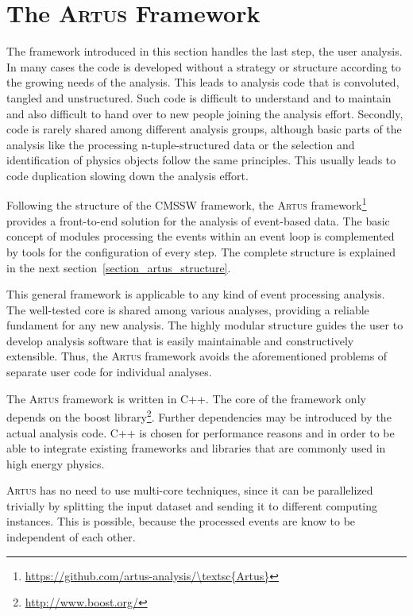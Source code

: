 \documentclass[3p]{elsarticle}
\newcommand{\software}[1]{\textsc{#1}\xspace}
\newcommand{\artus}{\software{Artus}}
\begin{document}
\section{The \artus Framework \label{section_artus_motivation}}

The framework introduced in this section handles the last step, the user analysis.
In many cases the code is developed without a strategy or structure according to the growing needs of the analysis.
This leads to analysis code that is convoluted, tangled and unstructured.
Such code is difficult to understand and to maintain and also difficult to hand over to new people joining the analysis effort.
Secondly, code is rarely shared among different analysis groups, although basic parts of the analysis like the processing n-tuple-structured data or the selection and identification of physics objects follow the same principles.
This usually leads to code duplication slowing down the analysis effort.

Following the structure of the CMSSW  framework, the \artus framework\footnote{\url{https://github.com/artus-analysis/\artus}} provides a front-to-end solution for the analysis of event-based data.
The basic concept of modules processing the events within an event loop is complemented by tools for the configuration of every step.
The complete structure is explained in the next section~\ref{section_artus_structure}.

This general framework is applicable to any kind of event processing analysis.
The well-tested core is shared among various analyses, providing a reliable fundament for any new analysis.
The highly modular structure guides the user to develop analysis software that is easily maintainable and constructively extensible.
Thus, the \artus framework avoids the aforementioned problems of separate user code for individual analyses.

The \artus framework is written in C++.
The core of the framework only depends on the boost library\footnote{\url{http://www.boost.org/}}.
Further dependencies may be introduced by the actual analysis code.
C++ is chosen for performance reasons and in order to be able to integrate existing frameworks and libraries that are commonly used in high energy physics.

\artus has no need to use multi-core techniques, since it can be parallelized trivially by splitting the input dataset and sending it to different computing instances.
This is possible, because the processed events are know to be independent of each other.
\end{document}
